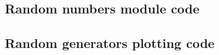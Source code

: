 \documentclass[twocolumn]{myarticle}
\begin{document}
\subsection{Random numbers module code}
\label{subsec:random_numbers_module_code}


\vspace{10pt}

\subsection{Random generators plotting code}
\label{subsec:random_generators_plotting_code}


\vspace{10pt}
\end{document}
